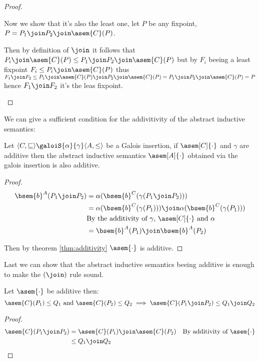 \begin{proof}
\begin{itemize}
      Now we show that it's also the least one, let $P$ be any fixpoint, 
      $P = P_1 \join P_2 \join \asem{C}(P)$.
      
      Then by definition of $\join$ it follows that $P_i \join \asem{C}(P) \leq 
      P_1 \join P_2 \join \asem{C}(P)$ but by $F_i$ beeing a least fixpoint
      $F_i \leq P_i \join \asem{C}(P)$ thus $F_1 \join F_2 \leq P_1
      \join \asem{C}(P) \join P_2 \join \asem{C}(P) = P_1 \join P_2 \join 
      \asem{C}(P) = P$ hence $F_1 \join F_2$ it's the leas fixpoint.
  \end{itemize}
\end{proof}

We can give a sufficient condition for the addivitivity of the abstract 
inductive semantics:
\begin{theorem}
  \label{thm:gamma-add}
  Let $\langle C, \sqsubseteq \rangle \galoiS{\alpha}{\gamma} \langle A, \leq 
  \rangle$ be a Galois insertion, if $\asem[C]{\cdot}$ and $\gamma$ are 
  additive then the abstract inductive semantics $\asem[A]{\cdot}$ obtained
  via the galois insertion is also additive.
\end{theorem}
\begin{proof}
  \begin{align*}
    \bsem{b}^A(P_1 \join P_2)
      &= \alpha(\bsem{b}^C(\gamma(P_1 \join P_2))) \\
      &= \alpha(\bsem{b}^C(\gamma(P_1))) \join\alpha(\bsem{b}^C(\gamma(P_1))) \\
      &\text{By the additivity of $\gamma$, $\asem[C]{\cdot}$ and $\alpha$}\\
      &= \bsem{b}^A(P_1) \join \bsem{b}^A(P_2)
  \end{align*}

  Then by theorem \ref{thm:additivity} $\asem{\cdot}$ is additive.
\end{proof}

Last we can show that the abstract inductive semantics beeing additive is 
enough to make the $(\join)$ rule sound.

\begin{theorem}
  \label{thm:sound-join}
  Let $\asem{\cdot}$ be additive then:
  $$\asem{C}(P_1) \leq Q_1 \text{ and } \asem{C}(P_2) \leq Q_2 \implies
  \asem{C}(P_1 \join P_2) \leq Q_1 \join Q_2$$
\end{theorem}
\begin{proof}
  \begin{align*}
    \asem{C}(P_1 \join P_2)
      &= \asem{C}(P_1) \join \asem{C}(P_2)
      &\text{By additivity of $\asem{\cdot}$} \\
      &\leq Q_1 \join Q_2
  \end{align*}
\end{proof}

